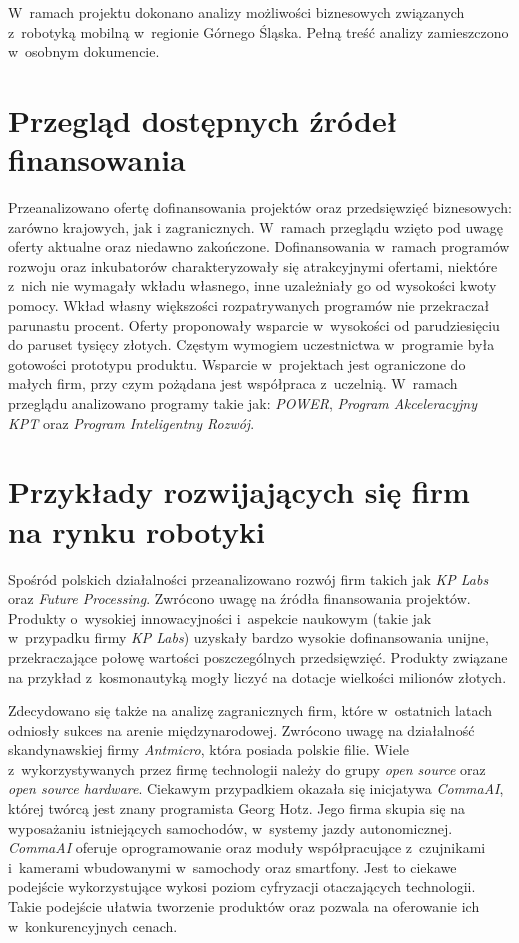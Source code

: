 W~ramach projektu dokonano analizy możliwości biznesowych związanych z~robotyką
mobilną w~regionie Górnego Śląska.
Pełną treść analizy zamieszczono w~osobnym dokumencie.

\section{Przegląd dostępnych źródeł finansowania}
Przeanalizowano ofertę dofinansowania projektów oraz przedsięwzięć biznesowych:
zarówno krajowych, jak i zagranicznych.
W~ramach przeglądu wzięto pod uwagę oferty aktualne oraz niedawno zakończone.
Dofinansowania w~ramach programów rozwoju oraz inkubatorów charakteryzowały się
atrakcyjnymi ofertami, niektóre z~nich nie wymagały wkładu własnego, inne
uzależniały go od wysokości kwoty pomocy.
Wkład własny większości rozpatrywanych programów nie przekraczał parunastu
procent.
Oferty proponowały wsparcie w~wysokości od parudziesięciu do paruset tysięcy
złotych.
Częstym wymogiem uczestnictwa w~programie była gotowości prototypu produktu.
Wsparcie w~projektach jest ograniczone do małych firm, przy czym pożądana jest
współpraca z~uczelnią.
W~ramach przeglądu analizowano programy takie jak: \textit{POWER},
\textit{Program Akceleracyjny KPT} oraz \textit{Program Inteligentny Rozwój}.

\section{Przykłady rozwijających się firm na rynku robotyki}
Spośród polskich działalności przeanalizowano rozwój firm takich jak
\textit{KP Labs} oraz \textit{Future Processing}.
Zwrócono uwagę na źródła finansowania projektów.
Produkty o~wysokiej innowacyjności i~aspekcie naukowym (takie jak w~przypadku
firmy \textit{KP Labs}) uzyskały bardzo wysokie dofinansowania unijne,
przekraczające połowę wartości poszczególnych przedsięwzięć.
Produkty związane na przykład z~kosmonautyką mogły liczyć na dotacje wielkości
milionów złotych.

Zdecydowano się także na analizę zagranicznych firm, które w~ostatnich latach
odniosły sukces na arenie międzynarodowej.
Zwrócono uwagę na działalność skandynawskiej firmy \textit{Antmicro}, która
posiada polskie filie.
Wiele z~wykorzystywanych przez firmę technologii należy do grupy \textit{open
source} oraz \textit{open source hardware}.
Ciekawym przypadkiem okazała się inicjatywa \textit{CommaAI}, której twórcą
jest znany programista Georg Hotz.
Jego firma skupia się na wyposażaniu istniejących samochodów, w~systemy jazdy
autonomicznej.
\textit{CommaAI} oferuje oprogramowanie oraz moduły współpracujące z~czujnikami
i~kamerami wbudowanymi w~samochody oraz smartfony.
Jest to ciekawe podejście wykorzystujące wykosi poziom cyfryzacji otaczających
technologii.
Takie podejście ułatwia tworzenie produktów oraz pozwala na oferowanie ich
w~konkurencyjnych cenach.

